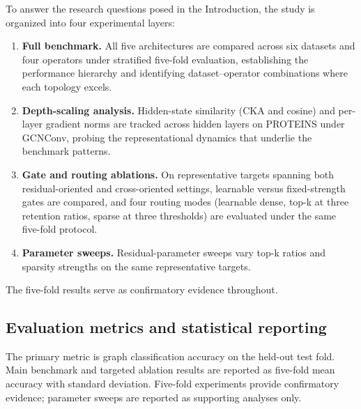 To answer the research questions posed in the Introduction, the study is organized into four experimental layers:

\begin{enumerate}
    \item \textbf{Full benchmark.} All five architectures are compared across six datasets and four operators under stratified five-fold evaluation, establishing the performance hierarchy and identifying dataset--operator combinations where each topology excels.
    \item \textbf{Depth-scaling analysis.} Hidden-state similarity (CKA and cosine) and per-layer gradient norms are tracked across hidden layers on PROTEINS under GCNConv, probing the representational dynamics that underlie the benchmark patterns.
    \item \textbf{Gate and routing ablations.} On representative targets spanning both residual-oriented and cross-oriented settings, learnable versus fixed-strength gates are compared, and four routing modes (learnable dense, top-k at three retention ratios, sparse at three thresholds) are evaluated under the same five-fold protocol.
    \item \textbf{Parameter sweeps.} Residual-parameter sweeps vary top-k ratios and sparsity strengths on the same representative targets.
\end{enumerate}

The five-fold results serve as confirmatory evidence throughout.

\subsection{Evaluation metrics and statistical reporting}

The primary metric is graph classification accuracy on the held-out test fold. Main benchmark and targeted ablation results are reported as five-fold mean accuracy with standard deviation. Five-fold experiments provide confirmatory evidence; parameter sweeps are reported as supporting analyses only.
